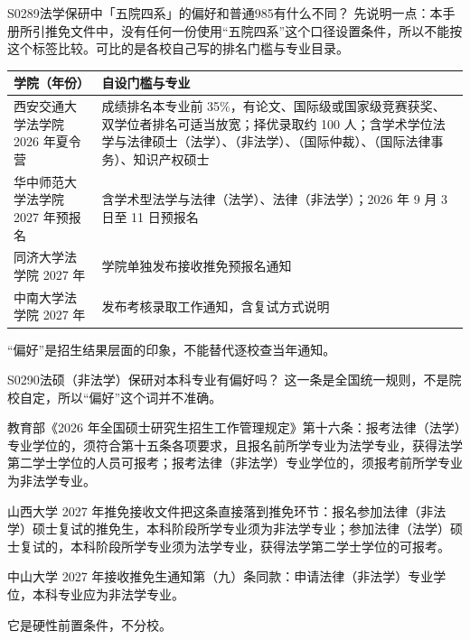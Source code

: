 \begin{qa}{S0289}{法学保研中「五院四系」的偏好和普通985有什么不同？}
先说明一点：本手册所引推免文件中，没有任何一份使用“五院四系”这个口径设置条件，所以不能按这个标签比较。可比的是各校自己写的排名门槛与专业目录。

\par\vspace{2pt}\nobreak\begin{center}\footnotesize
\begin{tabularx}{\textwidth}{>{\raggedright\arraybackslash}X>{\raggedright\arraybackslash}X}
\toprule
\textbf{学院（年份）} & \textbf{自设门槛与专业} \\ \midrule
西安交通大学法学院 2026 年夏令营 & 成绩排名本专业前 35\%，有论文、国际级或国家级竞赛获奖、双学位者排名可适当放宽；择优录取约 100 人；含学术学位法学与法律硕士（法学）、（非法学）、（国际仲裁）、（国际法律事务）、知识产权硕士 \\
华中师范大学法学院 2027 年预报名 & 含学术型法学与法律（法学）、法律（非法学）；2026 年 9 月 3 日至 11 日预报名 \\
同济大学法学院 2027 年 & 学院单独发布接收推免预报名通知 \\
中南大学法学院 2027 年 & 发布考核录取工作通知，含复试方式说明 \\
\bottomrule
\end{tabularx}
\end{center}\vspace{2pt}\par

“偏好”是招生结果层面的印象，不能替代逐校查当年通知。
\end{qa}

\begin{qa}{S0290}{法硕（非法学）保研对本科专业有偏好吗？}
这一条是全国统一规则，不是院校自定，所以“偏好”这个词并不准确。

教育部《2026 年全国硕士研究生招生工作管理规定》第十六条：报考法律（法学）专业学位的，须符合第十五条各项要求，且报名前所学专业为法学专业，获得法学第二学士学位的人员可报考；报考法律（非法学）专业学位的，须报考前所学专业为非法学专业。

山西大学 2027 年推免接收文件把这条直接落到推免环节：报名参加法律（非法学）硕士复试的推免生，本科阶段所学专业须为非法学专业；参加法律（法学）硕士复试的，本科阶段所学专业须为法学专业，获得法学第二学士学位的可报考。

中山大学 2027 年接收推免生通知第（九）条同款：申请法律（非法学）专业学位，本科专业应为非法学专业。

它是硬性前置条件，不分校。
\end{qa}

